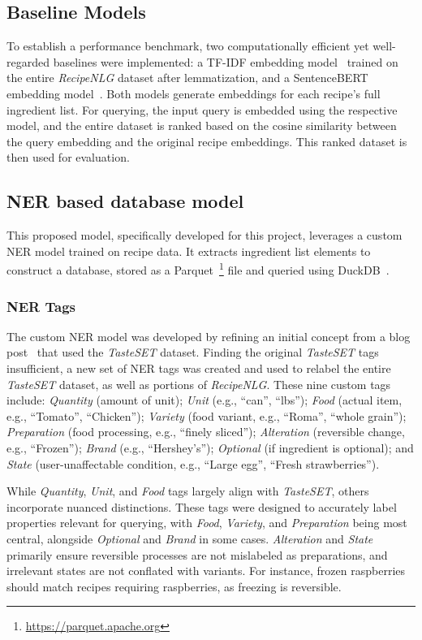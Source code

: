 \documentclass[11pt]{article}
\begin{document}
\subsection{Baseline Models}
To establish a performance benchmark, two computationally efficient yet
well-regarded baselines were implemented: a TF-IDF embedding model~\cite{tfidf}
trained on the entire \emph{RecipeNLG} dataset after lemmatization, and a
SentenceBERT embedding model~\cite{sentence-bert}.
Both models generate embeddings for each recipe's full ingredient list.
For querying, the input query is embedded using the respective model, and the
entire dataset is ranked based on the cosine similarity between the query
embedding and the original recipe embeddings.
This ranked dataset is then used for evaluation.

\subsection{NER based database model}
This proposed model, specifically developed for this project, leverages a custom
NER model trained on recipe data.
It extracts ingredient list elements to construct a database, stored as a
Parquet~\footnote{\url{https://parquet.apache.org}} file and queried using
DuckDB~\cite{duckdb}.

\subsubsection{NER Tags}\label{sec:ner_tags}
The custom NER model was developed by refining an initial concept from a blog
post~\cite{ingNerwb} that used the \emph{TasteSET} dataset.
Finding the original \emph{TasteSET} tags insufficient, a new set of NER tags
was created and used to relabel the entire \emph{TasteSET} dataset, as well as
portions of \emph{RecipeNLG}.
These nine custom tags include: \emph{Quantity} (amount of unit); \emph{Unit}
(e.g., ``can'', ``lbs''); \emph{Food} (actual item, e.g., ``Tomato'',
``Chicken''); \emph{Variety} (food variant, e.g., ``Roma'', ``whole grain'');
\emph{Preparation} (food processing, e.g., ``finely sliced''); \emph{Alteration}
(reversible change, e.g., ``Frozen''); \emph{Brand} (e.g., ``Hershey's'');
\emph{Optional} (if ingredient is optional); and \emph{State} (user-unaffectable
condition, e.g., ``Large egg'', ``Fresh strawberries'').

While \emph{Quantity}, \emph{Unit}, and \emph{Food} tags largely align with
\emph{TasteSET}, others incorporate nuanced distinctions.
These tags were designed to accurately label properties relevant for querying,
with \emph{Food}, \emph{Variety}, and \emph{Preparation} being most central,
alongside \emph{Optional} and \emph{Brand} in some cases.
\emph{Alteration} and \emph{State} primarily ensure reversible processes are not
mislabeled as preparations, and irrelevant states are not conflated with
variants.
For instance, frozen raspberries should match recipes requiring raspberries, as
freezing is reversible.
\end{document}

